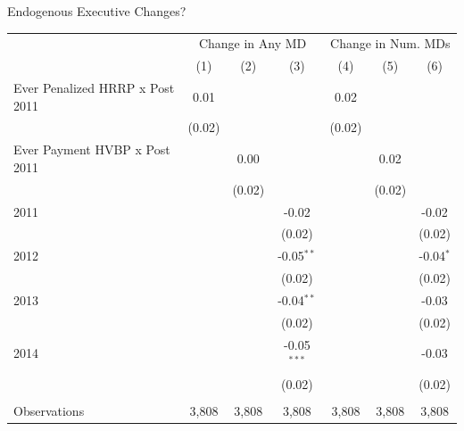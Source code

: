 \documentclass[notes,11pt, aspectratio=169]{beamer}
\begin{document}
\begin{frame}[noframenumbering]{Endogenous Executive Changes?}\label{execchanges}
\small
    \begin{table}[ht!]
   \centering
   \begin{tabular}{lcccccc}
      \toprule
       & \multicolumn{3}{c}{Change in Any MD} & \multicolumn{3}{c}{Change in Num. MDs}\\
                                      & (1)    & (2)    & (3)           & (4)    & (5)    & (6)\\  
      \midrule 
      Ever Penalized HRRP x Post 2011 & 0.01   &        &               & 0.02   &        &   \\   
                                      & (0.02) &        &               & (0.02) &        &   \\   
      Ever Payment HVBP x Post 2011   &        & 0.00   &               &        & 0.02   &   \\   
                                      &        & (0.02) &               &        & (0.02) &   \\   
      2011                            &        &        & -0.02         &        &        & -0.02\\   
                                      &        &        & (0.02)        &        &        & (0.02)\\   
      2012                            &        &        & -0.05$^{**}$  &        &        & -0.04$^{*}$\\   
                                      &        &        & (0.02)        &        &        & (0.02)\\   
      2013                            &        &        & -0.04$^{**}$  &        &        & -0.03\\   
                                      &        &        & (0.02)        &        &        & (0.02)\\   
      2014                            &        &        & -0.05$^{***}$ &        &        & -0.03\\   
                                      &        &        & (0.02)        &        &        & (0.02)\\   
       \\
      Observations                    & 3,808  & 3,808  & 3,808         & 3,808  & 3,808  & 3,808\\  
      \bottomrule
   \end{tabular}
\end{table}

\hyperlink{sigman}{}

\end{frame}
\end{document}
